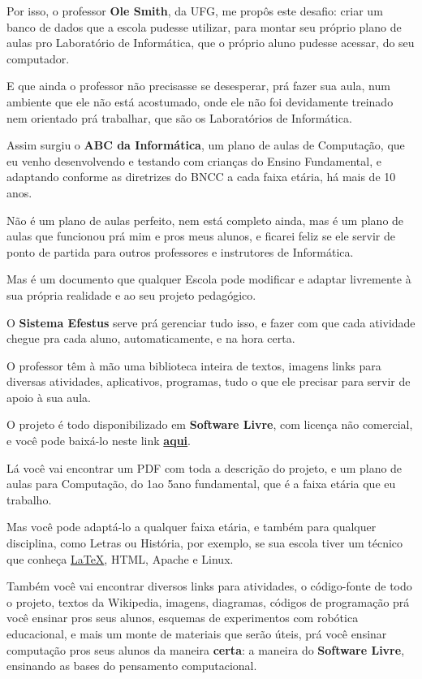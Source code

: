 \begin{multicols}{2}
Por isso, o professor \textbf{Ole Smith}, da UFG, me propôs este desafio: criar um banco de dados que a escola pudesse utilizar, para montar seu próprio plano de aulas pro Laboratório de Informática, que o próprio aluno pudesse acessar, do seu computador.

E que ainda o professor não precisasse se desesperar, prá fazer sua aula, num ambiente que ele não está acostumado, onde ele não foi devidamente treinado nem orientado prá trabalhar, que são os Laboratórios de Informática.

Assim surgiu o \textbf{ABC da Informática}, um plano de aulas de Computação, que eu venho desenvolvendo e testando com crianças do Ensino Fundamental, e adaptando conforme as diretrizes do BNCC a cada faixa etária, há mais de 10 anos.

Não é um plano de aulas perfeito, nem está completo ainda, mas é um plano de aulas que funcionou prá mim e pros meus alunos, e ficarei feliz se ele servir de ponto de partida para outros professores e instrutores de Informática.

Mas é um documento que qualquer Escola pode modificar e adaptar livremente à sua própria realidade e ao seu projeto pedagógico.

O \textbf{Sistema Efestus} serve prá gerenciar tudo isso, e fazer com que cada atividade chegue pra cada aluno, automaticamente, e na hora certa.

O professor têm à mão uma biblioteca inteira de textos, imagens links para diversas atividades, aplicativos, programas, tudo o que ele precisar para servir de apoio à sua aula.

O projeto é todo disponibilizado em \textbf{Software Livre}, com licença não comercial, e você pode baixá-lo neste link \href{https://github.com/aravecchia/HEFESTUS/blob/main/BNCC-Tecnologia.pdf}{\textbf{\Large aqui}}.

Lá você vai encontrar um PDF com toda a descrição do projeto, e um plano de aulas para Computação, do 1\textordmasculine\space ao 5\textordmasculine\space ano fundamental, que é a faixa etária que eu trabalho.

Mas você pode adaptá-lo a qualquer faixa etária, e também para qualquer disciplina, como Letras ou História, por exemplo, se sua escola tiver um técnico que conheça \href{https://www.latex-project.org}{\LaTeX}, HTML, Apache e Linux.

Também você vai encontrar diversos links para atividades, o código-fonte de todo o projeto, textos da Wikipedia, imagens, diagramas, códigos de programação prá você ensinar pros seus alunos, esquemas de experimentos com robótica educacional, e mais um monte de materiais que serão úteis, prá você ensinar computação pros seus alunos da maneira \textbf{certa}: a maneira do \textbf{Software Livre}, ensinando as bases do pensamento computacional.


\end{multicols}
